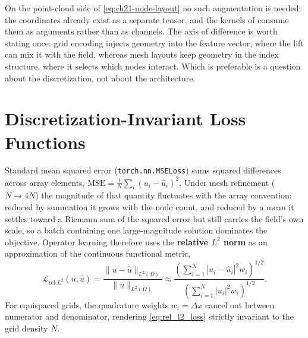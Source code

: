 On the point-cloud side of \eqref{eq:ch21-node-layout} no such augmentation is needed:
the coordinates already exist as a separate tensor, and the kernels of
 consume them as arguments
rather than as channels. The axis of difference is worth stating once: grid encoding
injects geometry into the feature vector, where the lift can mix it with the field,
whereas mesh layouts keep geometry in the index structure, where it selects which nodes
interact. Which is preferable is a question about the discretization, not about the
architecture.

\section{Discretization-Invariant Loss Functions}
\label{sec:ch21-loss}

Standard mean squared error (\texttt{torch.nn.MSELoss}) sums squared differences across
array elements, $\text{MSE} = \frac{1}{N} \sum_i (u_i - \hat{u}_i)^2$. Under mesh
refinement ($N \to 4N$) the magnitude of that quantity fluctuates with the array
convention: reduced by summation it grows with the node count, and reduced by a mean it
settles toward a Riemann sum of the squared error but still carries the field's own
scale, so a batch containing one large-magnitude solution dominates the objective.
Operator learning therefore uses the \textbf{relative $L^2$ norm} as an approximation of
the continuous functional metric,
\begin{equation}
  \label{eq:rel_l2_loss}
  \mathcal{L}_{\text{rel-}L^2}(u, \hat{u}) = \frac{\| u - \hat{u} \|_{L^2(\Omega)}}{\| u \|_{L^2(\Omega)}} \approx \frac{\left( \sum_{i=1}^N |u_i - \hat{u}_i|^2 w_i \right)^{1/2}}{\left( \sum_{i=1}^N |u_i|^2 w_i \right)^{1/2}}.
\end{equation}
For equispaced grids, the quadrature weights $w_i = \Delta x$ cancel out between numerator
and denominator, rendering \eqref{eq:rel_l2_loss} strictly invariant to the grid density
$N$. 

